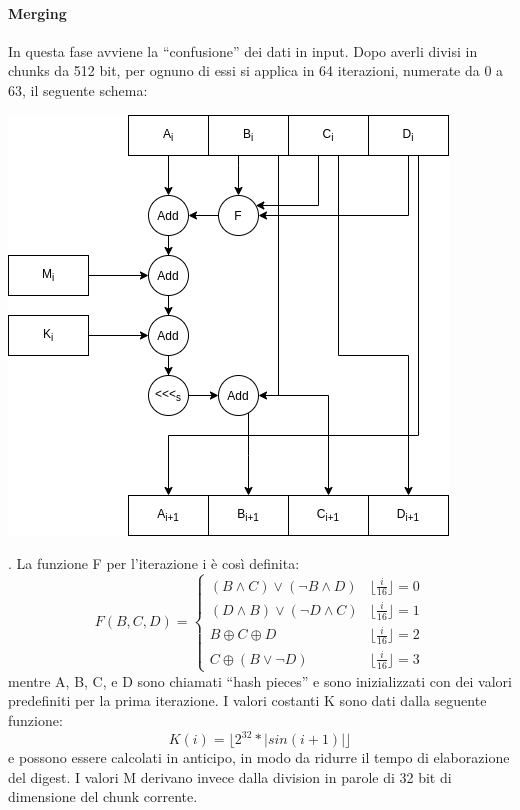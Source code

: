 \paragraph{Merging} In questa fase avviene la ``confusione'' dei dati in input. Dopo averli divisi in chunks da 512 bit, per ognuno di essi si applica in 64 iterazioni, numerate da 0 a 63, il seguente schema:
\begin{center}
    \includegraphics[scale=0.50]{./images/md5.png}
\end{center}.
La funzione F per l'iterazione i è così definita:
\begin{equation*}
    F(B, C, D) = \left\{
    \begin{array}{ll}
        (B \land  C) \lor (\lnot B \land D) & \lfloor \frac{i}{16} \rfloor = 0 \\
        (D \land  B) \lor (\lnot D \land C) & \lfloor \frac{i}{16} \rfloor = 1 \\
        B \oplus   C \oplus D               & \lfloor \frac{i}{16} \rfloor = 2 \\
        C \oplus (B \lor \lnot D)           & \lfloor \frac{i}{16} \rfloor = 3
    \end{array}
    \right.
\end{equation*}
mentre A, B, C, e D sono chiamati ``hash pieces'' e sono inizializzati con dei valori predefiniti per la prima iterazione. I valori costanti K sono dati dalla seguente funzione:
$$
    K(i) = \lfloor 2^{32} * \left\lvert sin(i + 1) \right\rvert  \rfloor
$$
e possono essere calcolati in anticipo, in modo da ridurre il tempo di elaborazione del digest. I valori M derivano invece dalla division in parole di 32 bit di dimensione del chunk corrente.


